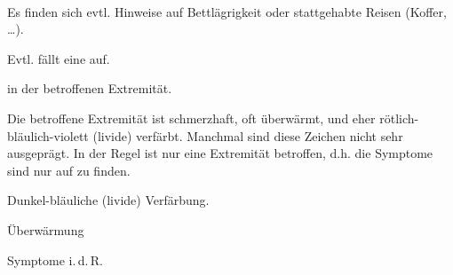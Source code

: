 {\TxABCDE}
{~
\begin{ABCDEText}
  \item[\ABCDE{1}] Es finden sich evtl.
  Hinweise auf Bettlägrigkeit oder stattgehabte Reisen
  (Koffer, \ldots). 
  \item[\ABCDE{2}] Evtl. fällt eine
   auf.
  \item[\ABCDE{4}]  in der
  betroffenen Extremität.
  \item[\ABCDE{\ldots}] Die betroffene Extremität ist
  schmerzhaft, oft überwärmt, und eher
  rötlich-bläulich-violett (livide) verfärbt. Manchmal sind
  diese Zeichen nicht sehr ausgeprägt.
  In der Regel ist nur eine Extremität betroffen, d.h. die
Symptome sind nur auf  zu finden.
\end{ABCDEText}
}
{
\begin{ABCDESlide}
  \item[\ABCDE{1}] 
  \item[\ABCDE{2}] 
  \item[\ABCDE{3}] 
  \item[\ABCDE{4}] 
  \item[\ABCDE{\ldots}] 
  \begin{compactitem}
  \item Dunkel-bläuliche (livide) Verfärbung. 
  \item Überwärmung
  \item Symptome i.\,d.\,R. 
  \end{compactitem}
\end{ABCDESlide}
}
{}
{}
{}


